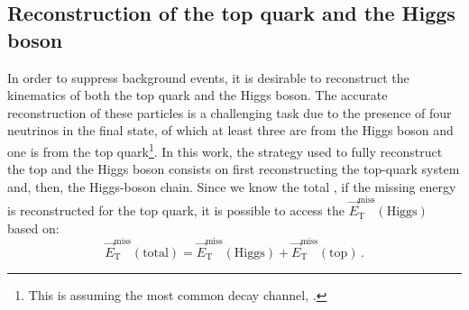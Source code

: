 %	



\subsection{Reconstruction of the top quark and the Higgs boson}
\label{sec:ChaptH:Sig:EventReconstruction} 
In order to suppress background events, it is desirable to reconstruct the 
kinematics of both the top quark and the Higgs boson. 
The accurate reconstruction of these particles is a challenging task 
due to the presence of four neutrinos in the final state, of which at least three 
are from the Higgs boson and one is from the top quark\footnote{This is 
assuming the most common decay channel, \Htautau.}. 
In this work, the strategy used to fully reconstruct the top and the Higgs boson consists on first
reconstructing the top-quark system and, then, the Higgs-boson chain. Since we know
the total \MET, if the missing energy is reconstructed for the top quark, 
it is possible to access the $\overrightarrow{E}_{\text{T}}^{\text{miss}} (\text{Higgs})$ based on:
\begin{equation*}
	\overrightarrow{E}_{\text{T}}^{\text{miss}} (\text{total}) = \overrightarrow{E}_{\text{T}}^{\text{miss}} (\text{Higgs}) + \overrightarrow{E}_{\text{T}}^{\text{miss}} (\text{top}) \,.
\end{equation*}


